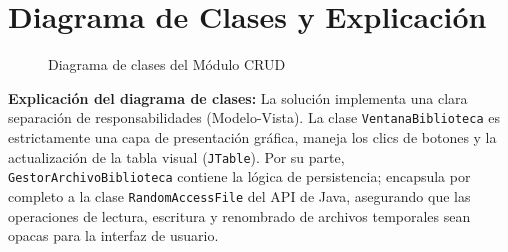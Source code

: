 \documentclass[12pt,a4paper]{article}
\begin{document}
\section{Diagrama de Clases y Explicación}
\begin{figure}[h]
    \centering
    \caption{Diagrama de clases del Módulo CRUD}
\end{figure}

\textbf{Explicación del diagrama de clases:}
La solución implementa una clara separación de responsabilidades (Modelo-Vista). La clase \texttt{VentanaBiblioteca} es estrictamente una capa de presentación gráfica, maneja los clics de botones y la actualización de la tabla visual (\texttt{JTable}). Por su parte, \texttt{GestorArchivoBiblioteca} contiene la lógica de persistencia; encapsula por completo a la clase \texttt{RandomAccessFile} del API de Java, asegurando que las operaciones de lectura, escritura y renombrado de archivos temporales sean opacas para la interfaz de usuario.
\end{document}
